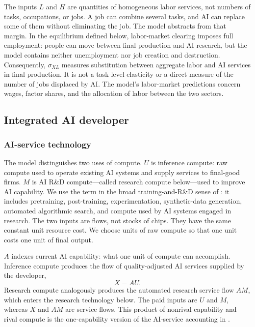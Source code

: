 \begin{remark}
The inputs \(L\) and \(H\) are quantities of homogeneous labor services, not
numbers of tasks, occupations, or jobs. A job can combine several tasks, and AI
can replace some of them without eliminating the job. The model abstracts from
that margin. In the equilibrium defined below, labor-market clearing imposes
full employment: people can move between final production and AI research, but
the model contains neither unemployment nor job creation and destruction.
Consequently, \(\sigma_{XL}\)
measures substitution between aggregate labor and AI services in final
production. It is not a task-level elasticity or a direct measure of the number
of jobs displaced by AI. The model's labor-market predictions concern wages,
factor shares, and the allocation of labor between the two sectors.
\end{remark}

\subsection{Integrated AI developer}

\subsubsection{AI-service technology}

The model distinguishes two uses of compute. \(U\) is inference compute: raw
compute used to operate existing AI systems and supply services to final-good
firms. \(M\) is AI R\&D compute---called research compute below---used to
improve AI capability. We use the term in the broad training-and-R\&D sense of
\citet{korinekmckelvey2026}: it includes pretraining, post-training,
experimentation, synthetic-data generation, automated algorithmic search, and
compute used by AI systems engaged in research. The two inputs are flows, not
stocks of chips. They have the same constant unit resource cost. We choose units
of raw compute so that one unit costs one unit of final output.

\(A\) indexes current AI capability: what one unit of compute can accomplish.
Inference compute produces the flow of quality-adjusted AI services supplied by
the developer,
\begin{equation}
 X=AU.
 \label{eq:axm-ai-service}
\end{equation}
Research compute analogously produces the automated research service flow
\(AM\), which enters the research technology below. The paid inputs are \(U\)
and \(M\), whereas \(X\) and \(AM\) are service flows. This product of nonrival
capability and rival compute is the one-capability version of the AI-service
accounting in \citet{davidsonetal2026}.

